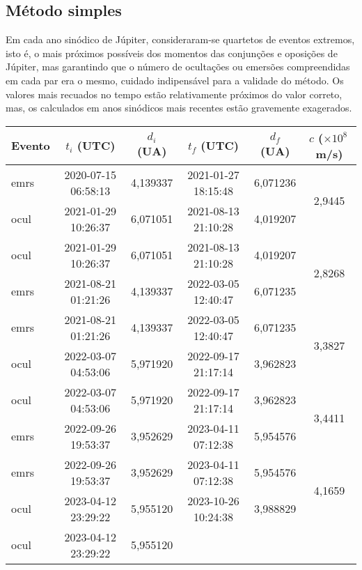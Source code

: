 \documentclass[]{article}
\begin{document}
\subsection{Método simples}
Em cada ano
sinódico de Júpiter, consideraram-se quartetos de eventos extremos, isto é, o
mais próximos possíveis dos momentos das conjunções e oposições de Júpiter, mas
garantindo que o número de ocultações ou emersões compreendidas em cada par era
o mesmo, cuidado indipensável para a validade do método.
Os
valores mais recuados no tempo estão relativamente próximos do valor correto,
mas, os calculados em anos sinódicos mais recentes estão gravemente exagerados.
\begin{table}[htb]
  \begin{center}
    \begin{tabular}{lccccc}
      \hline
      Evento &  $t_i$ (UTC) & $d_i$ (UA) & $t_f$ (UTC) & $d_f$ (UA) & $c$
      ($\times10^8$\,m/s)\\
      \hline
      emrs  & 2020-07-15 06:58:13 & 4,139337   
            & 2021-01-27 18:15:48 & 6,071236  
            & \multirow{2}{*}{2,9445}\\
      ocul  & 2021-01-29 10:26:37 & 6,071051  
            & 2021-08-13 21:10:28 & 4,019207 \\
      \hline
      ocul  & 2021-01-29 10:26:37 & 6,071051  
            & 2021-08-13 21:10:28 & 4,019207 
            & \multirow{2}{*}{2,8268}\\
      emrs  & 2021-08-21 01:21:26 & 4,139337
            & 2022-03-05 12:40:47 & 6,071235\\
      \hline
      emrs  & 2021-08-21 01:21:26 & 4,139337
            & 2022-03-05 12:40:47 & 6,071235
            & \multirow{2}{*}{3,3827}\\
      ocul  & 2022-03-07 04:53:06 & 5,971920
            & 2022-09-17 21:17:14 & 3,962823\\
      \hline
      ocul  & 2022-03-07 04:53:06 & 5,971920
            & 2022-09-17 21:17:14 & 3,962823
            & \multirow{2}{*}{3,4411}\\
      emrs  & 2022-09-26 19:53:37 & 3,952629
            & 2023-04-11 07:12:38 & 5,954576\\
      \hline
      emrs  & 2022-09-26 19:53:37 & 3,952629
            & 2023-04-11 07:12:38 & 5,954576
            & \multirow{2}{*}{4,1659}\\
      ocul  & 2023-04-12 23:29:22 & 5,955120
            & 2023-10-26 10:24:38 & 3,988829\\
      \hline
      ocul  & 2023-04-12 23:29:22 & 5,955120

\end{tabular}
\end{center}
\end{table}
\end{document}

